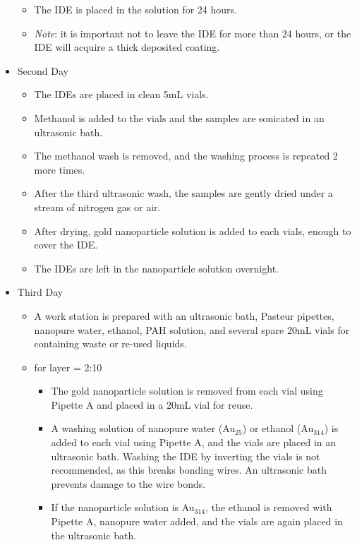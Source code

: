 \documentclass[12pt,oneside,english]{article}
\begin{document}
\begin{itemize}
\begin{itemize}
            \item The IDE is placed in the solution for 24 hours.
            \item \emph{Note}: it is important not to leave the IDE for more than 24 hours, or the IDE will acquire a thick deposited coating.
        \end{itemize}
        \item Second Day
        \begin{itemize}
            \item The IDEs are placed in clean 5mL vials.
            \item Methanol is added to the vials and the samples are sonicated in an ultrasonic bath.
            \item The methanol wash is removed, and the washing process is repeated 2 more times.
            \item After the third ultrasonic wash, the samples are gently dried under a stream of nitrogen gas or air.
            \item After drying, gold nanoparticle solution is added to each vials, enough to cover the IDE.
            \item The IDEs are left in the nanoparticle solution overnight.
        \end{itemize}
        \item Third Day
        \begin{itemize}
            \item A work station is prepared with an ultrasonic bath, Pasteur pipettes, nanopure water, ethanol, PAH solution, and several spare 20mL vials for containing waste or re-used liquids.
            \item for layer = 2:10 
            \begin{itemize}
                \item The gold nanoparticle solution is removed from each vial using Pipette A and placed in a 20mL vial for reuse.
                \item A washing solution of nanopure water (Au$_{25}$) or ethanol (Au$_{314}$) is added to each vial using Pipette A, and the vials are placed in an ultrasonic bath.
                    \subitem Washing the IDE by inverting the vials is not recommended, as this breaks bonding wires.  An ultrasonic bath prevents damage to the wire bonds.
                \item If the nanoparticle solution is Au$_{314}$, the ethanol is removed with Pipette A, nanopure water added, and the vials are again placed in the ultrasonic bath.

\end{itemize}
\end{itemize}
\end{itemize}
\end{document}
